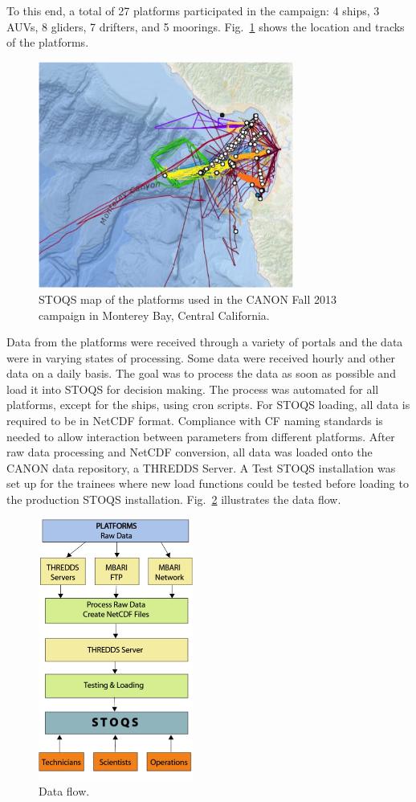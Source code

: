 To this end, a total of 27 platforms participated in the campaign: 4 ships, 3 AUVs, 8 gliders, 7 drifters, and 5 moorings.  Fig.~\ref{fig:ReikoFigure1} shows the location and tracks of the platforms.

\begin{figure}[htbp]
\centering
\includegraphics[width=3.3in]{ReikoFigure1.png}
\caption{STOQS map of the platforms used in the CANON Fall 2013 campaign in Monterey Bay, Central California.}
\label{fig:ReikoFigure1}
\end{figure}

Data from the platforms were received through a variety of portals and the data were in varying states of processing.  Some data were received hourly and other data on a daily basis.  The goal was to process the data as soon as possible and load it into STOQS for decision making.  The process was automated for all platforms, except for the ships, using cron scripts.  For STOQS loading, all data is required to be in NetCDF format.  Compliance with CF naming standards is needed to allow interaction between parameters from different platforms.  After raw data processing and NetCDF conversion, all data was loaded onto the CANON data repository, a THREDDS Server.  A Test STOQS installation was set up for the trainees where new load functions could be tested before loading to the production STOQS installation.   Fig.~\ref{fig:ReikoFigure2} illustrates the data flow.

\begin{figure}[htbp]
\centering
\includegraphics[width=2.0in]{ReikoFigure2.png}
\caption{Data flow.}
\label{fig:ReikoFigure2}
\end{figure}


